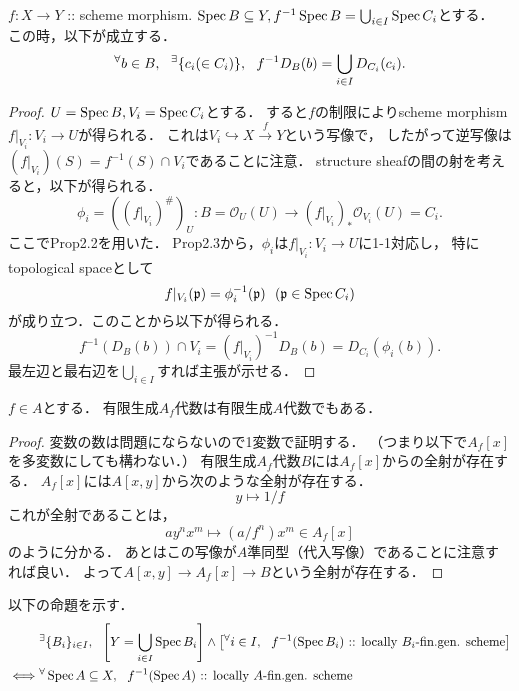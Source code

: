 \documentclass[a4paper]{jsarticle}
\newcommand{\shO}{\mathcal{O}}
\begin{document}
\begin{Lemma}
    $f: X \to Y$ :: scheme morphism.
    $\operatorname{Spec} B \subseteq Y, f^{-1}\operatorname{Spec} B=\bigcup_{i \in I} \operatorname{Spec} C_i$とする．
    この時，以下が成立する．
    \[
        {}^{\forall} b \in B,~~ {}^{\exists} \{c_i(\in C_i)\},~~
        f^{-1}D_B(b)=\bigcup_{i \in I}D_{C_i}(c_i).
    \]
\end{Lemma}
\begin{proof}
    $U=\operatorname{Spec} B, V_i=\operatorname{Spec} C_i$とする．
    すると$f$の制限によりscheme morphism $f|_{V_i}: V_i \to U$が得られる．
    これは$V_i \hookrightarrow X \xrightarrow{f} Y$という写像で，
    したがって逆写像は$(f|_{V_i})(S)=f^{-1}(S) \cap V_i$であることに注意．
    structure sheafの間の射を考えると，以下が得られる．
    \[ \phi_i=\left((f|_{V_i})^{\#}\right)_{U}: B=\shO_U(U) \to (f|_{V_i})_* \shO_{V_i}(U)=C_i. \]
    ここでProp2.2を用いた．
    Prop2.3から，$\phi_i$は$f|_{V_i}: V_i \to U$に1-1対応し，
    特にtopological spaceとして
    \[ f|_{V_i}(\mathfrak{p})=\phi_i^{-1}(\mathfrak{p}) ~~(\mathfrak{p} \in \operatorname{Spec} C_i) \]
    が成り立つ．このことから以下が得られる．
    \[ f^{-1}(D_B(b)) \cap V_i=(f|_{V_i})^{-1}D_B(b)=D_{C_i}(\phi_i(b)). \]
    最左辺と最右辺を$\bigcup_{i \in I}$すれば主張が示せる．
\end{proof}

\begin{Lemma}
    $f \in A$とする．
    有限生成$A_{f}$代数は有限生成$A$代数でもある．
\end{Lemma}
\begin{proof}
    変数の数は問題にならないので1変数で証明する．
    （つまり以下で$A_{f}[x]$を多変数にしても構わない．）
    有限生成$A_{f}$代数$B$には$A_{f}[x]$からの全射が存在する．
    $A_{f}[x]$には$A[x,y]$から次のような全射が存在する．
    \[ y \mapsto 1/f \]
    これが全射であることは，
    \[ ay^nx^m \mapsto (a/f^n)x^m \in A_{f}[x] \]
    のように分かる．
    あとはこの写像が$A$準同型（代入写像）であることに注意すれば良い．
    よって$A[x,y] \to A_{f}[x] \to B$という全射が存在する．
\end{proof}

以下の命題を示す．
\begin{align*}
    {}&
    {}^{\exists} \{B_i\}_{i \in I},~~
    \left[Y=\bigcup_{i \in I} \operatorname{Spec} B_i\right] \land \left[{}^{\forall} i \in I,~~ f^{-1}(\operatorname{Spec} B_i)\text{ :: locally $B_i$-fin.gen. scheme}\right] \\
    \iff&
    {}^{\forall} \operatorname{Spec} A \subseteq X,~~ f^{-1}(\operatorname{Spec} A)\text{ :: locally $A$-fin.gen. scheme}
\end{align*}
\end{document}
